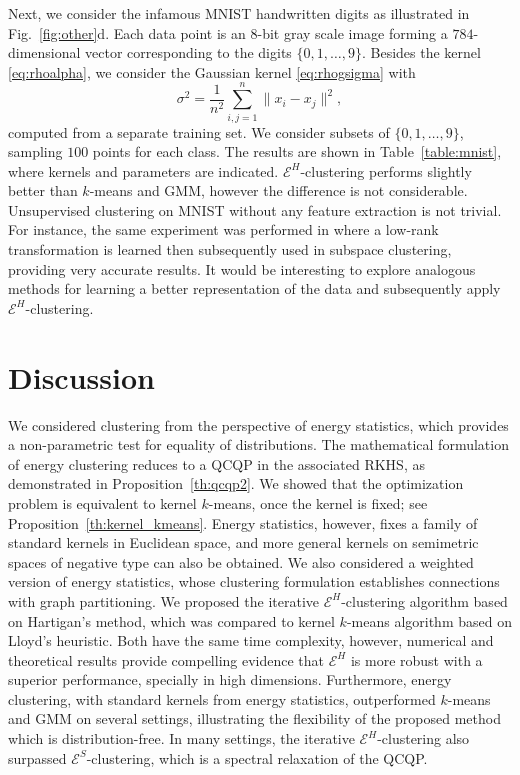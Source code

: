 \documentclass[aps,preprint,nofootinbib,floatfix]{revtex4-1}
\begin{document}
Next, we consider 
the infamous MNIST handwritten digits
as illustrated in Fig.~\ref{fig:other}d.
Each data point is an $8$-bit gray scale
image forming a $784$-dimensional vector 
corresponding to the digits $\{0,1,\dotsc,9 \}$.
Besides the kernel \eqref{eq:rhoalpha}, we
consider the Gaussian kernel \eqref{eq:rhogsigma} with 
\begin{equation}
\label{eq:sigma}
\sigma^2 = \dfrac{1}{n^2} \sum_{i,j=1}^n \| x_i - x_j \|^2 ,
\end{equation}
computed from a separate
training set.
We consider subsets of $\{0,1,\dotsc,9 \}$, 
sampling $100$ points 
for each class. 
The results are shown in Table~\ref{table:mnist}, where kernels
and parameters are indicated.
$\mathcal{E}^H$-clustering performs slightly better than $k$-means
and GMM, however the difference is not considerable.
Unsupervised clustering on MNIST without any feature extraction
is not trivial. For instance,
the same experiment was performed in \cite{Sapiro} where a low-rank
transformation is learned then subsequently used in subspace clustering,
providing very accurate results. It would be interesting to 
explore analogous methods
for learning a better representation of the data and subsequently apply
$\mathcal{E}^H$-clustering.



\section{Discussion}
\label{sec:conclusion}

We considered clustering from the perspective of energy
statistics, which provides a non-parametric test for 
equality of distributions.
The mathematical formulation of energy clustering 
reduces to a QCQP in the associated RKHS, as demonstrated in 
Proposition~\ref{th:qcqp2}.
We showed that the optimization problem
is equivalent
to kernel $k$-means, once the kernel is fixed; see
Proposition~\ref{th:kernel_kmeans}. Energy statistics, however, fixes
a family of standard kernels in Euclidean space, and
more general kernels 
on semimetric spaces of negative type can also be obtained.
We also considered a weighted version of energy statistics, whose 
clustering formulation establishes connections with 
graph partitioning.
We proposed the iterative $\mathcal{E}^H$-clustering algorithm based on 
Hartigan's method, which was compared to kernel $k$-means algorithm
based on Lloyd's heuristic.
Both have the same time complexity, however, numerical and theoretical
results provide compelling evidence that $\mathcal{E}^H$
is more robust with a superior performance, specially in high
dimensions. 
Furthermore, energy clustering, with standard kernels from energy
statistics, outperformed $k$-means and GMM
on several settings, illustrating the flexibility
of the proposed method which is distribution-free. In many
settings, the iterative
$\mathcal{E}^H$-clustering also surpassed $\mathcal{E}^S$-clustering, which
is a spectral relaxation of the QCQP.
\end{document}
